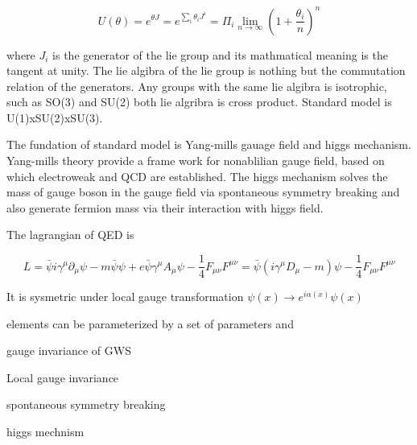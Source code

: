 \begin{equation}
    U(\theta) = e^{\theta J} = e^{\sum_i \theta_i J^i }  =  \Pi_i \lim_{n \to \infty} (1+\frac{\theta_i}{n})^n
\end{equation}


where $J_i$ is the generator of the lie group and its mathmatical meaning is the tangent at unity. The lie algibra of the lie group is nothing but the commutation relation of the generators. Any groups with the same lie algibra is isotrophic, such as SO(3) and SU(2) both lie algribra is cross product. Standard model is U(1)xSU(2)xSU(3).

The fundation of standard model is Yang-mills gauage field and higgs mechanism. Yang-mills theory provide a frame work for nonablilian gauge field, based on which electroweak and QCD are established. The higgs mechanism solves the mass of gauge boson in the gauge field via spontaneous symmetry breaking and also generate fermion mass via their interaction with higgs field. 

The lagrangian of QED is 

\begin{equation}
    \mathit{L} = \bar{\psi} i\gamma^\mu \partial_\mu \psi - m \bar{\psi} \psi + e \bar{\psi} \gamma^\mu A_\mu \psi - \frac{1}{4}F_{\mu\nu}F^{\mu\nu} = \bar{\psi} (i\gamma^\mu D_\mu - m) \psi - \frac{1}{4}F_{\mu\nu}F^{\mu\nu}
\end{equation}

It is sysmetric under local gauge transformation $\psi(x) \to e^{i \alpha(x) } \psi(x) $





elements can be parameterized by a set of parameters and


gauge invariance of 
GWS



Local gauge invariance


spontaneous symmetry breaking

higgs mechnism

